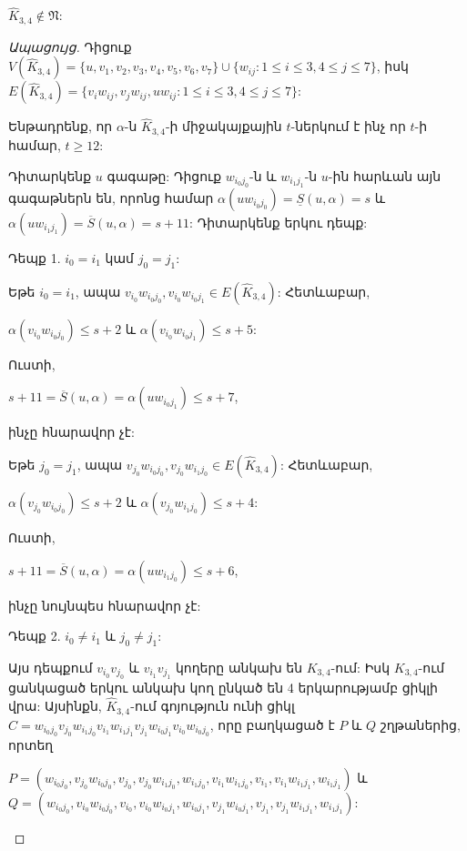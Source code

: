 \begin{theorem}
\label{t3_subdivision_K34} $\widehat{K}_{3,4}\notin \mathfrak{N}$:
\end{theorem}
\begin{proof}[Ապացույց]
Դիցուք
$V(\widehat{K}_{3,4})=\{u,v_{1},v_{2},v_{3},v_{4},v_{5},v_{6},v_{7}\}\cup
\{w_{ij}:1\leq i\leq 3, 4\leq j\leq 7\}$, իսկ
$E(\widehat{K}_{3,4})=\{v_{i}w_{ij},v_{j}w_{ij},uw_{ij}:1\leq i\leq
3, 4\leq j\leq 7\}$:

Ենթադրենք, որ $\alpha$-ն $\widehat{K}_{3,4}$-ի միջակայքային $t$-ներկում է ինչ որ $t$-ի համար, $t\geq 12$:

Դիտարկենք $u$ գագաթը: Դիցուք $w_{i_{0}j_{0}}$-ն և $w_{i_{1}j_{1}}$-ն
$u$-ին հարևան այն գագաթներն են, որոնց համար 
$\alpha(uw_{i_{0}j_{0}})=\underline{S}(u,\alpha)=s$ և
$\alpha(uw_{i_{1}j_{1}})=\overline{S}(u,\alpha)=s+11$: Դիտարկենք երկու դեպք:

Դեպք 1. $i_{0}=i_{1}$ կամ $j_{0}=j_{1}$:

Եթե $i_{0}=i_{1}$, ապա
$v_{i_{0}}w_{i_{0}j_{0}},v_{i_{0}}w_{i_{0}j_{1}}\in
E(\widehat{K}_{3,4})$: Հետևաբար,

\begin{center}
$\alpha(v_{i_{0}}w_{i_{0}j_{0}})\leq s+2$ և
$\alpha(v_{i_{0}}w_{i_{0}j_{1}})\leq s+5$:
\end{center}

Ուստի,
\begin{center}
$s+11=\overline{S}(u,\alpha)=\alpha(uw_{i_{0}j_{1}})\leq s+7$,
\end{center}
ինչը հնարավոր չէ:

Եթե $j_{0}=j_{1}$, ապա
$v_{j_{0}}w_{i_{0}j_{0}},v_{j_{0}}w_{i_{1}j_{0}}\in
E(\widehat{K}_{3,4})$: Հետևաբար,

\begin{center}
$\alpha(v_{j_{0}}w_{i_{0}j_{0}})\leq s+2$ և
$\alpha(v_{j_{0}}w_{i_{1}j_{0}})\leq s+4$:
\end{center}

Ուստի,
\begin{center}
$s+11=\overline{S}(u,\alpha)=\alpha(uw_{i_{1}j_{0}})\leq s+6$,
\end{center}
ինչը նույնպես հնարավոր չէ:

Դեպք 2. $i_{0}\neq i_{1}$ և $j_{0}\neq j_{1}$:

Այս դեպքում $v_{i_{0}}v_{j_{0}}$ և $v_{i_{1}}v_{j_{1}}$ կողերը անկախ են $K_{3,4}$-ում: Իսկ
$K_{3,4}$-ում ցանկացած երկու անկախ կող ընկած են 4 երկարությամբ ցիկլի վրա: Այսինքն, $\widehat{K}_{3,4}$-ում գոյություն ունի ցիկլ
$C=w_{i_{0}j_{0}}v_{j_{0}}w_{i_{1}j_{0}}v_{i_{1}}w_{i_{1}j_{1}}v_{j_{1}}w_{i_{0}j_{1}}v_{i_{0}}w_{i_{0}j_{0}}$, որը բաղկացած է $P$ և $Q$ շղթաներից, որտեղ
\begin{center}
$P=\left(w_{i_{0}j_{0}},v_{j_{0}}w_{i_{0}j_{0}},v_{j_{0}},v_{j_{0}}w_{i_{1}j_{0}},w_{i_{1}j_{0}},v_{i_{1}}w_{i_{1}j_{0}},v_{i_{1}},v_{i_{1}}w_{i_{1}j_{1}},w_{i_{1}j_{1}}\right)$ և\\
$Q=\left(w_{i_{0}j_{0}},v_{i_{0}}w_{i_{0}j_{0}},v_{i_{0}},v_{i_{0}}w_{i_{0}j_{1}},w_{i_{0}j_{1}},v_{j_{1}}w_{i_{0}j_{1}},v_{j_{1}},v_{j_{1}}w_{i_{1}j_{1}},w_{i_{1}j_{1}}\right)$:
\end{center}


\end{proof}
